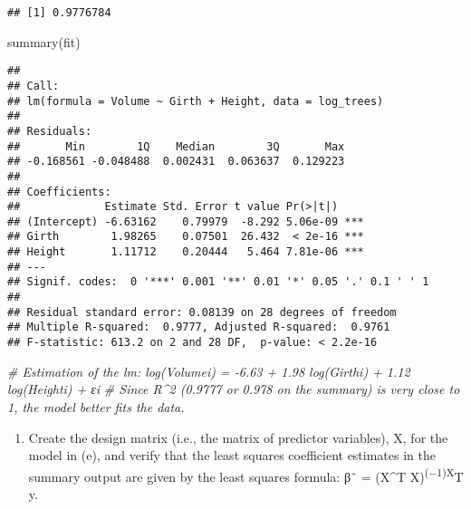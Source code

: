 \documentclass[
]{article}
\newenvironment{Shaded}{\begin{snugshade}}{\end{snugshade}}
\newcommand{\CommentTok}[1]{\textcolor[rgb]{0.56,0.35,0.01}{\textit{#1}}}
\newcommand{\FunctionTok}[1]{\textcolor[rgb]{0.00,0.00,0.00}{#1}}
\newcommand{\NormalTok}[1]{#1}
\providecommand{\tightlist}{%
  \setlength{\itemsep}{0pt}\setlength{\parskip}{0pt}}
\begin{document}
\begin{verbatim}
## [1] 0.9776784
\end{verbatim}

\begin{Shaded}
\begin{Highlighting}[]
\FunctionTok{summary}\NormalTok{(fit)}
\end{Highlighting}
\end{Shaded}

\begin{verbatim}
## 
## Call:
## lm(formula = Volume ~ Girth + Height, data = log_trees)
## 
## Residuals:
##       Min        1Q    Median        3Q       Max 
## -0.168561 -0.048488  0.002431  0.063637  0.129223 
## 
## Coefficients:
##             Estimate Std. Error t value Pr(>|t|)    
## (Intercept) -6.63162    0.79979  -8.292 5.06e-09 ***
## Girth        1.98265    0.07501  26.432  < 2e-16 ***
## Height       1.11712    0.20444   5.464 7.81e-06 ***
## ---
## Signif. codes:  0 '***' 0.001 '**' 0.01 '*' 0.05 '.' 0.1 ' ' 1
## 
## Residual standard error: 0.08139 on 28 degrees of freedom
## Multiple R-squared:  0.9777, Adjusted R-squared:  0.9761 
## F-statistic: 613.2 on 2 and 28 DF,  p-value: < 2.2e-16
\end{verbatim}

\begin{Shaded}
\begin{Highlighting}[]
\CommentTok{\# Estimation of the lm: log(Volumei) = {-}6.63 + 1.98 log(Girthi) + 1.12 log(Heighti) + εi}
\CommentTok{\# Since R\^{}2 (0.9777 or 0.978 on the summary) is very close to 1, the model better fits the data. }
\end{Highlighting}
\end{Shaded}

\begin{enumerate}
\def\labelenumi{(\alph{enumi})}
\setcounter{enumi}{5}
\tightlist
\item
  Create the design matrix (i.e., the matrix of predictor variables), X,
  for the model in (e), and verify that the least squares coefficient
  estimates in the summary output are given by the least squares
  formula: βˆ = (X\^{}T X)\textsuperscript{(−1)X}T y.
\end{enumerate}
\end{document}
